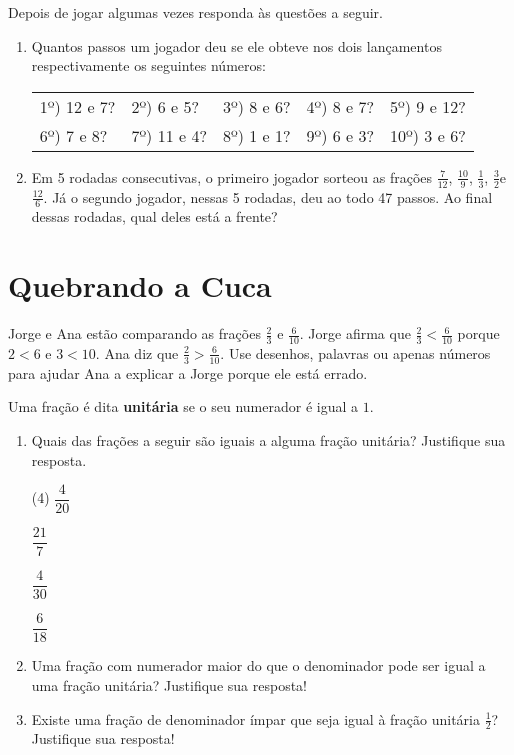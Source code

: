 \begin{atividade}{}
Depois de jogar algumas vezes responda às questões a seguir.


\begin{enumerate}
 \item Quantos passos um jogador deu se ele obteve nos dois lançamentos respectivamente os seguintes números:

 \noindent \begin{tabular}{m{}m{}m{}m{}m{}}
1º) 12 e 7?  & 2º) 6 e 5? & 3º) 8 e 6? & 4º) 8 e 7? & 5º) 9 e 12? \\
6º) 7 e 8? & 7º) 11 e 4? & 8º) 1 e 1? & 9º) 6 e 3? & 10º) 3 e 6?
\end{tabular}

\item   Em 5 rodadas consecutivas, o primeiro jogador sorteou as frações  $\frac{7}{12}$, $\frac{10}{9}$, $\frac{1}{3}$, $\frac{3}{2}$e  $\frac{12}{6}$. Já o segundo jogador, nessas 5 rodadas, deu ao todo 47 passos. Ao final dessas rodadas, qual deles está a frente?
\end{enumerate}
\end{atividade}
\clearpage
\section{Quebrando a Cuca}

\begin{atividade}{}\label{chap4-ativ21}

Jorge e Ana estão comparando as frações $\frac{2}{3}$ e $\frac{6}{10}$. Jorge afirma que
$\frac{2}{3} < \frac{6}{10}$ porque $2 < 6$ e $3 < 10$. Ana diz que $\frac{2}{3} > \frac{6}{10}$. Use desenhos, palavras ou apenas números para ajudar Ana a explicar a Jorge porque ele está errado.
\end{atividade}


\begin{atividade}{}\label{chap4-ativ22}

Uma fração é dita {\bfseries unitária} se o seu numerador é igual a $1$.
\begin{enumerate}
\item  Quais das frações a seguir são iguais a alguma fração unitária? Justifique sua resposta.


\begin{tasks}[label=\textbf{\roman*)}, item-indent=3em, label-width=16pt](4)
\task $\dfrac{4}{20}$

\task $\dfrac{21}{7}$

\task $\dfrac{4}{30}$

\task $\dfrac{6}{18}$
\end{tasks}


\item  Uma fração com numerador maior do que o denominador pode ser igual a uma fração unitária? Justifique sua resposta!

\item  Existe uma fração de denominador ímpar que seja igual à fração unitária $\frac{1}{2}$? Justifique sua resposta!
\end{enumerate}
\end{atividade}

